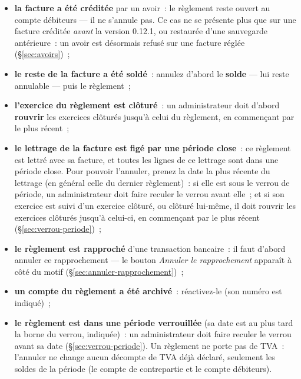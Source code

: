 \documentclass[a4paper,11pt,oneside]{article}
\begin{document}
\begin{itemize}
    \item \textbf{la facture a été créditée} par un avoir~: le règlement reste ouvert au compte
          débiteurs --- il ne s'annule pas. Ce cas ne se présente plus
          que sur une facture créditée \emph{avant} la version 0.12.1, ou restaurée d'une sauvegarde
          antérieure~: un avoir est désormais refusé sur une facture réglée (\S\ref{sec:avoirs})~;
    \item \textbf{le reste de la facture a été soldé}~: annulez d'abord le \textbf{solde} --- lui
          reste annulable --- puis le règlement~;
    \item \textbf{l'exercice du règlement est clôturé}~: un administrateur doit
          d'abord \textbf{rouvrir} les exercices clôturés jusqu'à celui du règlement, en
          commençant par le plus récent~;
    \item \textbf{le lettrage de la facture est figé par une période close}~: ce règlement est
          lettré avec sa facture, et toutes les lignes de ce lettrage sont dans une période
          close. Pour pouvoir l'annuler, prenez la date la plus récente du lettrage (en général
          celle du dernier règlement)~: si elle est sous le verrou de période, un administrateur
          doit faire reculer le verrou avant elle~; et si son exercice est suivi d'un exercice
          clôturé, ou clôturé lui-même, il doit rouvrir les exercices clôturés jusqu'à
          celui-ci, en commençant par le plus récent (\S\ref{sec:verrou-periode})~;
    \item \textbf{le règlement est rapproché} d'une transaction bancaire~: il faut d'abord
          annuler ce rapprochement --- le bouton \emph{Annuler le rapprochement} apparaît à
          côté du motif (\S\ref{sec:annuler-rapprochement})~;
    \item \textbf{un compte du règlement a été archivé}~: réactivez-le (son numéro est indiqué)~;
    \item \textbf{le règlement est dans une période verrouillée} (sa date est au plus tard la
          borne du verrou, indiquée)~: un administrateur doit faire reculer le verrou avant sa
          date (\S\ref{sec:verrou-periode}). Un règlement ne porte pas de TVA~: l'annuler ne change
          aucun décompte de TVA déjà déclaré, seulement les soldes de la période (le compte de
          contrepartie et le compte débiteurs).
\end{itemize}
\end{document}
